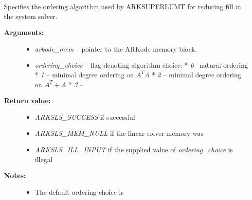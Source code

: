 \documentclass[letterpaper,10pt,english]{sphinxmanual}
\begin{document}
\begin{fulllineitems}
\label{c_interface/User_callable:ARKSuperLUMTSetOrdering}
Specifies the ordering algorithm used by ARKSUPERLUMT for reducing
fill in the system solver.
\begin{description}
\item[{\textbf{Arguments:}}] \leavevmode\begin{itemize}
\item {} 
\emph{arkode\_mem} -- pointer to the ARKode memory block.

\item {} 
\emph{ordering\_choice} -- flag denoting algorithm choice:
* \emph{0} --natural ordering
* \emph{1} -- minimal degree ordering on $A^TA$
* \emph{2} -- minimal degree ordering on $A^T + A$
* \emph{3} -- 

\end{itemize}

\item[{\textbf{Return value:}}] \leavevmode\begin{itemize}
\item {} 
\emph{ARKSLS\_SUCCESS}  if successful

\item {} 
\emph{ARKSLS\_MEM\_NULL} if the linear solver memory was 

\item {} 
\emph{ARKSLS\_ILL\_INPUT} if the supplied value of \emph{ordering\_choice} is illegal

\end{itemize}

\item[{\textbf{Notes:}}] \leavevmode\begin{itemize}
\item {} 
The default ordering choice is 

\end{itemize}

\end{description}

\end{fulllineitems}

\end{document}
